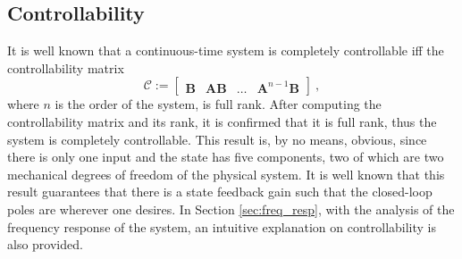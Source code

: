 \documentclass[letterpaper, 10 pt, conference]{ieeeconf}
\begin{document}

\subsection{Controllability}\label{sec:ctrolbty}
It is well known that a continuous-time system is completely controllable iff the controllability matrix
\begin{equation*}
    \mathcal{C} := \begin{bmatrix} \mathbf{B} & \mathbf{AB}& \dots & \mathbf{A}^{n-1}\mathbf{B}
    \end{bmatrix}\:,
\end{equation*}
where $n$ is the order of the system, is full rank. After computing the controllability matrix and its rank, it is confirmed that it is full rank, thus the system is completely controllable. This result is, by no means, obvious, since there is only one input and the state has five components, two of which are two mechanical degrees of freedom of the physical system. It is well known that this result guarantees that there is a state feedback gain such that the closed-loop poles are wherever one desires. In Section \ref{sec:freq_resp}, with the analysis of the frequency response of the system, an intuitive explanation on controllability is also provided.

\end{document}
